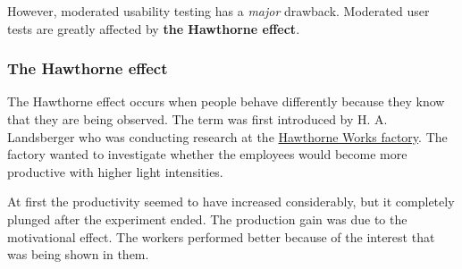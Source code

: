     However, moderated usability testing has a \textit{major} drawback. Moderated user tests are greatly affected by \textbf{the Hawthorne effect}.

    \subsubsection{The Hawthorne effect}
    The Hawthorne effect occurs when people behave differently because they know that they are being observed. The term was first introduced by H. A. Landsberger who was conducting research at the \underline{Hawthorne Works factory}. The factory wanted to investigate whether the employees would become more productive with higher light intensities. 
    
    At first the productivity seemed to have increased considerably, but it completely plunged after the experiment ended. The production gain was due to the motivational effect. The workers performed better because of the interest that was being shown in them.